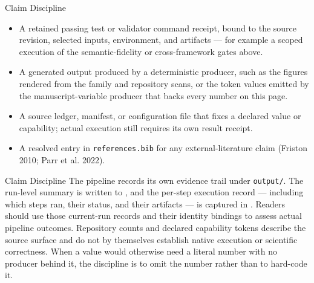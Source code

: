 \documentclass[
  ignorenonframetext,
]{beamer}
\providecommand{\tightlist}{%
  \setlength{\itemsep}{0pt}\setlength{\parskip}{0pt}}
\begin{document}
\begin{frame}{Claim Discipline}
\begin{itemize}
\tightlist
\item
  A retained passing test or validator command receipt, bound to the
  source revision, selected inputs, environment, and artifacts --- for
  example a scoped execution of the semantic-fidelity or cross-framework
  gates above.
\item
  A generated output produced by a deterministic producer, such as the
  figures rendered from the family and repository scans, or the token
  values emitted by the manuscript-variable producer that backs every
  number on this page.
\item
  A source ledger, manifest, or configuration file that fixes a declared
  value or capability; actual execution still requires its own result
  receipt.
\item
  A resolved entry in \texttt{references.bib} for any
  external-literature claim (Friston 2010; Parr et al. 2022).
\end{itemize}

\end{frame}

\begin{frame}{Claim Discipline}
The pipeline records its own evidence trail under \texttt{output/}. The
run-level summary is written to , and
the per-step execution record --- including which steps ran, their
status, and their artifacts --- is captured in
. Readers should use those
current-run records and their identity bindings to assess actual
pipeline outcomes. Repository counts and declared capability tokens
describe the source surface and do not by themselves establish native
execution or scientific correctness. When a value would otherwise need a
literal number with no producer behind it, the discipline is to omit the
number rather than to hard-code it.
\end{frame}
\end{document}
